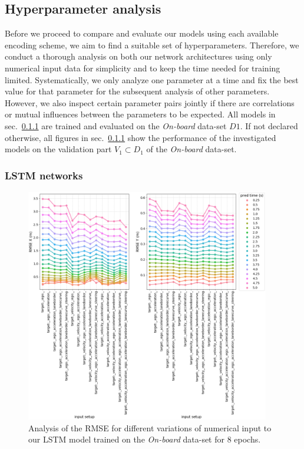 \subsection{Hyperparameter analysis}
\label{subsec:hyperparam_analysis}
Before we proceed to compare and evaluate our models using each available encoding scheme, we aim to find a suitable set of hyperparameters.
Therefore, we conduct a thorough analysis on both our network architectures using only numerical input data for simplicity and to keep the time needed for training limited.
Systematically, we only analyze one parameter at a time and fix the best value for that parameter for the subsequent analysis of other parameters.
However, we also inspect certain parameter pairs jointly if there are correlations or mutual influences between the parameters to be expected.
All models in sec.~\ref{subsubsec:hyperparam_lstm} are trained and evaluated on the \emph{On-board} data-set $D1$.
If not declared otherwise, all figures in sec.~\ref{subsubsec:hyperparam_lstm} show the performance of the investigated models on the validation part $V_1 \subset D_1$ of the \emph{On-board} data-set.

\subsubsection{\ac{LSTM} networks}
\label{subsubsec:hyperparam_lstm}

\begin{figure}[t!]
  \centering
  \includegraphics[width=0.95\textwidth]{imgs/lstm_input_data_analysis.eps}
  \caption{Analysis of the \ac{RMSE} for different variations of numerical input to our \ac{LSTM} model trained on the \emph{On-board} data-set for \num{8} epochs.}\label{fig:lstm_input_data_analysis}
\end{figure}

